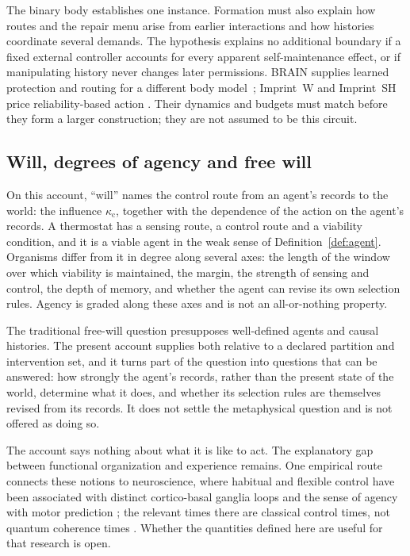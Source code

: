 \documentclass[11pt,a4paper]{article}
\begin{document}
The binary body establishes one instance. Formation must also explain
how routes and the repair menu arise from earlier interactions and how
histories coordinate several demands. The hypothesis explains no
additional boundary if a fixed external controller accounts for every
apparent self-maintenance effect, or if manipulating history never
changes later permissions. BRAIN supplies learned protection and
routing for a different body model~\cite{LiuBrainAnchor};
Imprint~W and Imprint~SH price reliability-based action
\cite{LiuWorldImprint,LiuImprintSH}. Their dynamics and budgets must
match before they form a larger construction; they are not assumed
to be this circuit.

\subsection{Will, degrees of agency and free will}

On this account, ``will'' names the control route from an agent's records to the world: the influence $\kappa_{\mathrm c}$, together with the dependence of the action on the agent's records. A thermostat has a sensing route, a control route and a viability condition, and it is a viable agent in the weak sense of Definition~\ref{def:agent}. Organisms differ from it in degree along several axes: the length of the window over which viability is maintained, the margin, the strength of sensing and control, the depth of memory, and whether the agent can revise its own selection rules. Agency is graded along these axes and is not an all-or-nothing property.

The traditional free-will question presupposes well-defined agents and causal histories. The present account supplies both relative to a declared partition and intervention set, and it turns part of the question into questions that can be answered: how strongly the agent's records, rather than the present state of the world, determine what it does, and whether its selection rules are themselves revised from its records. It does not settle the metaphysical question and is not offered as doing so.

The account says nothing about what it is like to act. The explanatory gap between functional organization and experience \cite{Levine1983,Chalmers1996} remains. One empirical route connects these notions to neuroscience, where habitual and flexible control have been associated with distinct cortico-basal ganglia loops \cite{Graybiel2008,Yin2006} and the sense of agency with motor prediction \cite{Haggard2005}; the relevant times there are classical control times, not quantum coherence times \cite{Tegmark2000}. Whether the quantities defined here are useful for that research is open.
\end{document}
